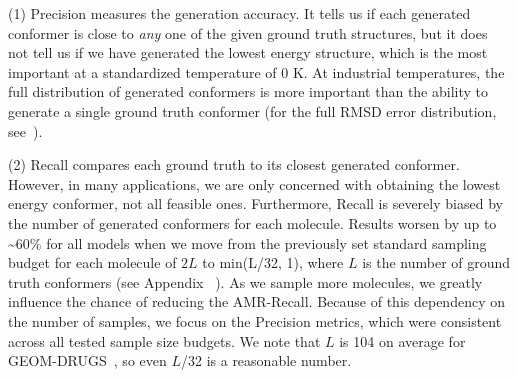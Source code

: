 (1) Precision measures the generation accuracy. It tells us if each generated conformer is close to \textit{any} one of the given ground truth structures, but it does not tell us if we have generated the lowest energy structure, which is the most important at a standardized temperature of 0 K. At industrial temperatures, the full distribution of generated conformers is more important than the ability to generate a single ground truth conformer (for the full RMSD error distribution, see~). 

(2) Recall compares each ground truth to its closest generated conformer. However, in many applications, we are only concerned with obtaining the lowest energy conformer, not all feasible ones. Furthermore, Recall is severely biased by the number of generated conformers for each molecule. Results worsen by up to \textasciitilde{60\%} for all models when we move from the previously set standard sampling budget for each molecule of $2L$ to min(L/32, 1), where $L$ is the number of ground truth conformers (see Appendix ~). As we sample more molecules, we greatly influence the chance of reducing the AMR-Recall. Because of this dependency on the number of samples, we focus on the Precision metrics, which were consistent across all tested sample size budgets. We note that $L$ is 104 on average for GEOM-DRUGS~\citep{CVGAE}, so even $L$/32 is a reasonable number.

